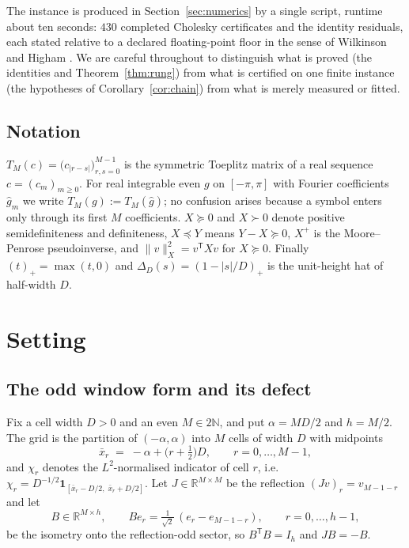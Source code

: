 \documentclass[11pt,a4paper]{article}
\theoremstyle{plain}
\theoremstyle{definition}
\newcommand{\R}{\mathbb{R}}
\newcommand{\N}{\mathbb{N}}
\newcommand{\T}{\mathsf{T}}
\newcommand{\Tm}[1]{T_{#1}}
\newcommand{\PSD}{\succeq 0}
\newcommand{\PD}{\succ 0}
\begin{document}
The instance is produced in Section~\ref{sec:numerics} by a single script, runtime
about ten seconds: $430$ completed Cholesky certificates and the identity residuals,
each stated relative to a declared floating-point floor in the sense of Wilkinson and
Higham \cite{Wilkinson1963,Higham2002}. We are careful throughout to distinguish what
is proved (the identities and Theorem~\ref{thm:rung}) from what is certified on one
finite instance (the hypotheses of Corollary~\ref{cor:chain}) from what is merely
measured or fitted.

\subsection{Notation}

$\Tm{M}(c)=\bigl(c_{|r-s|}\bigr)_{r,s=0}^{M-1}$ is the symmetric Toeplitz matrix of a
real sequence $c=(c_{m})_{m\ge0}$. For real integrable even $g$ on $[-\pi,\pi]$ with
Fourier coefficients $\widehat g_{m}$ we write $\Tm{M}(g):=\Tm{M}(\widehat g)$;
no confusion arises because a symbol enters only through its first $M$ coefficients.
$X\PSD$ and $X\PD$ denote positive semidefiniteness and definiteness, $X\preceq Y$
means $Y-X\PSD$, $X^{+}$ is the Moore--Penrose pseudoinverse, and
$\|v\|_{X}^{2}=v^{\T}Xv$ for $X\PSD$. Finally
$(t)_{+}=\max(t,0)$ and $\Delta_{D}(s)=(1-|s|/D)_{+}$ is the unit-height hat of
half-width $D$.

\section{Setting}
\label{sec:setting}

\subsection{The odd window form and its defect}

Fix a cell width $D>0$ and an even $M\in2\N$, and put $\alpha=MD/2$ and $h=M/2$.
The grid is the partition of $(-\alpha,\alpha)$ into $M$ cells of width $D$ with
midpoints
\begin{equation}
\label{eq:cells}
  \bar x_{r} \;=\; -\alpha+\bigl(r+\tfrac12\bigr)D, \qquad r=0,\dots,M-1 ,
\end{equation}
and $\chi_{r}$ denotes the $L^{2}$-normalised indicator of cell $r$, i.e.\
$\chi_{r}=D^{-1/2}\mathbf 1_{[\bar x_{r}-D/2,\;\bar x_{r}+D/2]}$. Let
$J\in\R^{M\times M}$ be the reflection $(Jv)_{r}=v_{M-1-r}$ and let
\begin{equation}
\label{eq:B}
  B\in\R^{M\times h},\qquad Be_{r}=\tfrac{1}{\sqrt2}\,(e_{r}-e_{M-1-r}),
  \qquad r=0,\dots,h-1,
\end{equation}
be the isometry onto the reflection-odd sector, so $B^{\T}B=I_{h}$ and
$JB=-B$.
\end{document}
